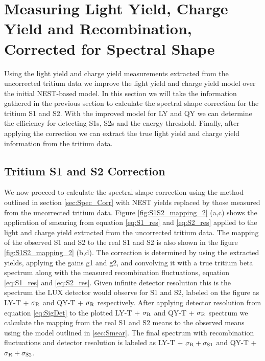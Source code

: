 \section{Measuring Light Yield, Charge Yield and Recombination, Corrected for Spectral Shape}

Using the light yield and charge yield measurements extracted from the uncorrected tritium data we improve the light yield and charge yield model over the initial NEST-based model. In this section we will take the information gathered in the previous section to calculate the spectral shape correction for the tritium S1 and S2. With the improved model for LY and QY we can determine the efficiency for detecting S1s, S2s and the energy threshold. Finally, after applying the correction we can extract the true light yield and charge yield information from the tritium data.

\subsection{Tritium S1 and S2 Correction}

We now proceed to calculate the spectral shape correction using the method outlined in section \ref{sec:Spec_Corr} with NEST yields replaced by those measured from the uncorrected tritium data. Figure \ref{fig:S1S2_mapping_2} (a,c) shows the application of smearing from equation \ref{eq:S1_res} and \ref{eq:S2_res} applied to the light and charge yield extracted from the uncorrected tritium data. The mapping of the observed S1 and S2 to the real S1 and S2 is also shown in the figure \ref{fig:S1S2_mapping_2} (b,d). The correction is determined by using the extracted yields, applying the gains g1 and g2, and convolving it with a true tritium beta spectrum along with the measured recombination fluctuations, equation \ref{eq:S1_res} and \ref{eq:S2_res}. Given infinite detector resolution this is the spectrum the LUX detector would observe for S1 and S2, labeled on the figure as LY-T + $\rm \sigma_R$ and QY-T + $\rm \sigma_R$ respectively. After applying detector resolution from equation \ref{eq:SigDet} to the plotted LY-T + $\rm \sigma_R$ and QY-T + $\rm \sigma_R$ spectrum we calculate the mapping from the real S1 and S2 means to the observed means using the model outlined in \ref{sec:Smear}. The final spectrum with recombination fluctuations and detector resolution is labeled as LY-T + $\rm \sigma_R + \sigma_{S1}$ and QY-T + $\rm \sigma_R + \sigma_{S2}$.


